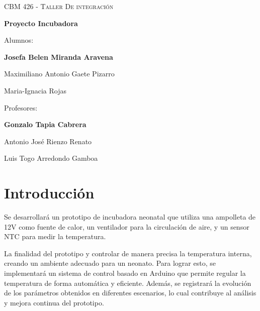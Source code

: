 \documentclass[spanish, a4paper, 11pt]{article}
\begin{document}
\thispagestyle{unicamp}

\begin{center}

	\null\vfill

	{\scshape\large CBM 426 - Taller De integración\par}

	\baselineskip

	{\LARGE\bfseries Proyecto Incubadora\par}

	\baselineskip

	Alumnos:\\[1ex]
	{\large\bfseries Josefa Belen Miranda Aravena

	Maximiliano Antonio Gaete Pizarro

	Maria-Ignacia Rojas \par}

	\baselineskip

	Profesores:\\[1ex]
	{\large\bfseries Gonzalo Tapia Cabrera

	Antonio José Rienzo Renato

	Luis Togo Arredondo Gamboa\par}

\end{center}

\vfill


\newpage

\onehalfspacing

\tableofcontents

\newpage

\section{Introducción}

Se desarrollará un prototipo de incubadora neonatal que utiliza una ampolleta de 12V como fuente de calor, un ventilador para la circulación de aire, y un sensor NTC para medir la temperatura. 

La finalidad del prototipo y controlar de manera precisa la temperatura interna, creando un ambiente adecuado para un neonato. Para lograr esto, se implementará un sistema de control basado en Arduino que permite regular la temperatura de forma automática y eficiente. Además, se registrará la evolución de los parámetros obtenidos en diferentes escenarios, lo cual contribuye al análisis y mejora continua del prototipo.\par
\end{document}
